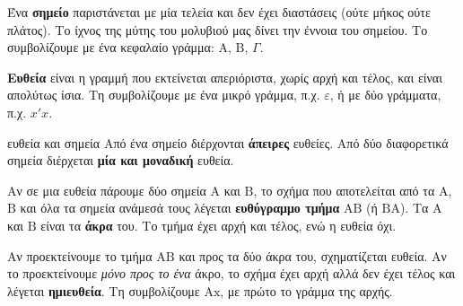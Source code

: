 

Ένα \textbf{σημείο} παριστάνεται με μία τελεία και δεν έχει διαστάσεις (ούτε μήκος ούτε πλάτος). Το ίχνος της μύτης του μολυβιού μας δίνει την έννοια του σημείου. Το συμβολίζουμε με ένα κεφαλαίο γράμμα: $\mathrm{Α}$, $\mathrm{Β}$, $\Gamma$.

\textbf{Ευθεία} είναι η γραμμή που εκτείνεται απεριόριστα, χωρίς αρχή και τέλος, και είναι απολύτως ίσια. Τη συμβολίζουμε με ένα μικρό γράμμα, π.χ. $\varepsilon$, ή με δύο γράμματα, π.χ. $x'x$.

\begin{idiotita}{ευθεία και σημεία}
Από ένα σημείο διέρχονται \textbf{άπειρες} ευθείες. Από δύο διαφορετικά σημεία διέρχεται \textbf{μία και μοναδική} ευθεία.
\end{idiotita}

\begin{center}
\end{center}


Αν σε μια ευθεία πάρουμε δύο σημεία $\mathrm{Α}$ και $\mathrm{Β}$, το σχήμα που αποτελείται από τα $\mathrm{Α}$, $\mathrm{Β}$ και όλα τα σημεία ανάμεσά τους λέγεται \textbf{ευθύγραμμο τμήμα} $\mathrm{ΑΒ}$ (ή $\mathrm{ΒΑ}$). Τα $\mathrm{Α}$ και $\mathrm{Β}$ είναι τα \textbf{άκρα} του. Το τμήμα έχει αρχή και τέλος, ενώ η ευθεία όχι.

Αν προεκτείνουμε το τμήμα $\mathrm{ΑΒ}$ και προς τα δύο άκρα του, σχηματίζεται ευθεία. Αν το προεκτείνουμε \emph{μόνο προς το ένα} άκρο, το σχήμα έχει αρχή αλλά δεν έχει τέλος και λέγεται \textbf{ημιευθεία}. Τη συμβολίζουμε $\mathrm{Αx}$, με πρώτο το γράμμα της αρχής.

